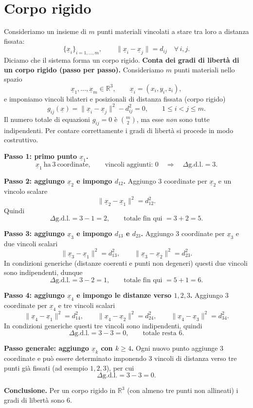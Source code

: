 \section{Corpo rigido}
Consideriamo un insieme di $m$ punti materiali vincolati a stare tra loro a distanza fissata:
\[
\{\underline{x}_i\}_{i=1,\dots,m},
\qquad
\|\underline{x}_i-\underline{x}_j\|=d_{ij}\quad \forall\, i,j.
\]
Diciamo che il sistema forma un corpo rigido.
\textbf{Conta dei gradi di libertà di un corpo rigido (passo per passo).}
Consideriamo $m$ punti materiali nello spazio
\[
\underline{x}_1,\dots,\underline{x}_m\in\mathbb{R}^3,
\qquad
\underline{x}_i=(x_i,y_i,z_i),
\]
e imponiamo vincoli bilateri e posizionali di distanza fissata (corpo rigido)
\[
g_{ij}(\underline{x})=\|\underline{x}_i-\underline{x}_j\|^2-d_{ij}^2=0,
\qquad 1\le i<j\le m.
\]
Il numero totale di equazioni $g_{ij}=0$ è $\binom{m}{2}$, ma esse \emph{non} sono tutte indipendenti.
Per contare correttamente i gradi di libertà si procede in modo costruttivo.

\medskip
\textbf{Passo 1: primo punto $\underline{x}_1$.}
\[
\underline{x}_1 \ \text{ha}\ 3\ \text{coordinate}, \qquad \text{vincoli aggiunti: }0
\quad\Longrightarrow\quad
\Delta \text{g.d.l.}=3.
\]

\medskip
\textbf{Passo 2: aggiungo $\underline{x}_2$ e impongo $d_{12}$.}
Aggiungo $3$ coordinate per $\underline{x}_2$ e un vincolo scalare
\[
\|\underline{x}_2-\underline{x}_1\|^2=d_{12}^2.
\]
Quindi
\[
\Delta \text{g.d.l.}=3-1=2,
\qquad
\text{totale fin qui }=3+2=5.
\]

\medskip
\textbf{Passo 3: aggiungo $\underline{x}_3$ e impongo $d_{13}$ e $d_{23}$.}
Aggiungo $3$ coordinate per $\underline{x}_3$ e due vincoli scalari
\[
\|\underline{x}_3-\underline{x}_1\|^2=d_{13}^2,
\qquad
\|\underline{x}_3-\underline{x}_2\|^2=d_{23}^2.
\]
In condizioni generiche (distanze coerenti e punti non degeneri) questi due vincoli sono indipendenti, dunque
\[
\Delta \text{g.d.l.}=3-2=1,
\qquad
\text{totale fin qui }=5+1=6.
\]

\medskip
\textbf{Passo 4: aggiungo $\underline{x}_4$ e impongo le distanze verso $1,2,3$.}
Aggiungo $3$ coordinate per $\underline{x}_4$ e tre vincoli scalari
\[
\|\underline{x}_4-\underline{x}_1\|^2=d_{14}^2,\qquad
\|\underline{x}_4-\underline{x}_2\|^2=d_{24}^2,\qquad
\|\underline{x}_4-\underline{x}_3\|^2=d_{34}^2.
\]
In condizioni generiche questi tre vincoli sono indipendenti, quindi
\[
\Delta \text{g.d.l.}=3-3=0,
\qquad
\text{totale resta }6.
\]

\medskip
\textbf{Passo generale: aggiungo $\underline{x}_k$ con $k\ge 4$.}
Ogni nuovo punto aggiunge $3$ coordinate e può essere determinato imponendo $3$ vincoli di distanza verso tre punti già fissati
(ad esempio $1,2,3$), per cui
\[
\Delta \text{g.d.l.}=3-3=0.
\]

\medskip
\textbf{Conclusione.}
Per un corpo rigido in $\mathbb{R}^3$ (con almeno tre punti non allineati) i gradi di libertà sono 6.
